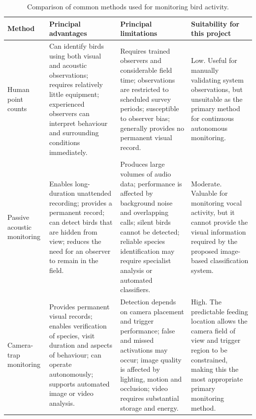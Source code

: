 \begin{table}[htbp]
    \centering
    \caption{Comparison of common methods used for monitoring bird activity.}
    \label{tab:birdmonitoringmethods}
    
    \small
    \renewcommand{\arraystretch}{1.25}
    
    \begin{tabularx}{\textwidth}{
        >{\raggedright\arraybackslash}p{}
        >{\raggedright\arraybackslash}X
        >{\raggedright\arraybackslash}X
        >{\raggedright\arraybackslash}p{}
    }
        \toprule
        \textbf{Method}
        & \textbf{Principal advantages}
        & \textbf{Principal limitations}
        & \textbf{Suitability for this project} \\
        \midrule
        
        Human point counts
        & Can identify birds using both visual and acoustic observations; requires relatively little equipment; experienced observers can interpret behaviour and surrounding conditions immediately.
        & Requires trained observers and considerable field time; observations are restricted to scheduled survey periods; susceptible to observer bias; generally provides no permanent visual record.
        & Low. Useful for manually validating system observations, but unsuitable as the primary method for continuous autonomous monitoring. \\
        
        \addlinespace
        
        Passive acoustic monitoring
        & Enables long-duration unattended recording; provides a permanent record; can detect birds that are hidden from view; reduces the need for an observer to remain in the field.
        & Produces large volumes of audio data; performance is affected by background noise and overlapping calls; silent birds cannot be detected; reliable species identification may require specialist analysis or automated classifiers.
        & Moderate. Valuable for monitoring vocal activity, but it cannot provide the visual information required by the proposed image-based classification system. \\
        
        \addlinespace
        
        Camera-trap monitoring
        & Provides permanent visual records; enables verification of species, visit duration and aspects of behaviour; can operate autonomously; supports automated image or video analysis.
        & Detection depends on camera placement and trigger performance; false and missed activations may occur; image quality is affected by lighting, motion and occlusion; video requires substantial storage and energy.
        & High. The predictable feeding location allows the camera field of view and trigger region to be constrained, making this the most appropriate primary monitoring method. \\
        

\end{tabularx}
\end{table}
